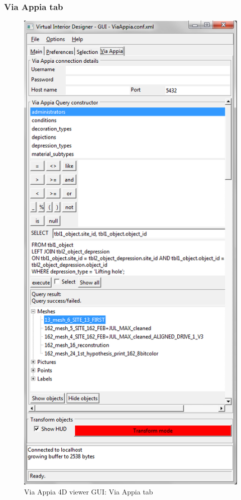 \documentclass[a4paper,11pt]{article}
\begin{document}
\subsubsection{Via Appia tab}

\begin{figure}[!ht]
\centering
\includegraphics[scale=0.5]{fig/viaappia}
\caption{Via Appia 4D viewer GUI: Via Appia tab}
\label{fig-guiva}
\end{figure}
\end{document}
